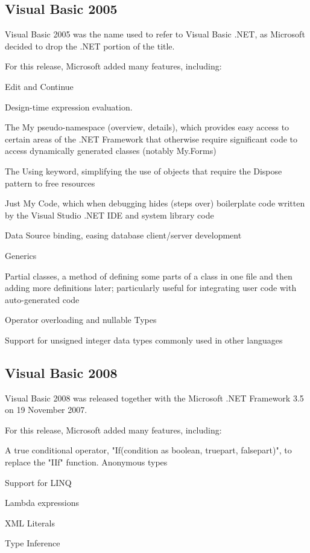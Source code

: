 \subsection{Visual Basic 2005}
Visual Basic 2005 was the name used to refer to Visual Basic .NET, as Microsoft decided to drop the .NET portion of the title.

For this release, Microsoft added many features, including:

Edit and Continue

Design-time expression evaluation.

The My pseudo-namespace (overview, details), which provides easy access to certain areas of the .NET Framework that otherwise require significant code to access dynamically generated classes (notably My.Forms)

The Using keyword, simplifying the use of objects that require the Dispose pattern to free resources

Just My Code, which when debugging hides (steps over) boilerplate code written by the Visual Studio .NET IDE and system library code

Data Source binding, easing database client/server development

Generics

Partial classes, a method of defining some parts of a class in one file and then adding more definitions later; particularly useful for integrating user code with auto-generated code

Operator overloading and nullable Types

Support for unsigned integer data types commonly used in other languages



\subsection{Visual Basic 2008}
Visual Basic 2008 was released together with the Microsoft .NET Framework 3.5 on 19 November 2007.

For this release, Microsoft added many features, including:

A true conditional operator, "If(condition as boolean, truepart, falsepart)", to replace the "IIf" function.
Anonymous types

Support for LINQ

Lambda expressions

XML Literals

Type Inference

